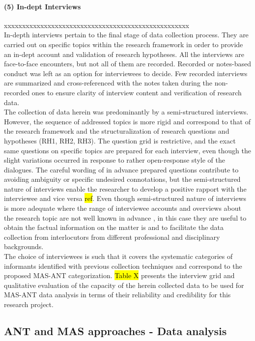 \documentclass[11pt]{report}
\begin{document}
\paragraph{(5) In-dept Interviews} xxxxxxxxxxxxxxxxxxxxxxxxxxxxxxxxxxxxxxxxxxxxxxxxxxx
\\
In-depth interviews pertain to the final stage of data collection process. They are carried out on specific topics within the research framework in order to provide an in-dept account and validation of research hypotheses. All the interviews are face-to-face encounters, but not all of them are recorded. Recorded or notes-based conduct was left as an option for interviewees to decide. Few recorded interviews are summarized and cross-referenced with the notes taken during the non-recorded ones to ensure clarity of interview content and verification of research data.
\\
The collection of data herein was predominantly by a semi-structured interviews. However, the sequence of addressed topics is more rigid and correspond to that of the research framework and the structuralization of research questions and hypotheses (RH1, RH2, RH3). The question grid is restrictive, and the exact same questions on specific topics are prepared for each interview, even though the slight variations occurred in response to rather open-response style of the dialogues. The careful wording of in advance prepared questions contribute to avoiding ambiguity or specific undesired connotations, but the semi-structured nature of interviews enable the researcher to develop a positive rapport with the interviewee and vice versa \hl{ref}. Even though semi-structured nature of interviews is more adequate where the range of interviewee accounts and overviews about the research topic are not well known in advance , in this case they are useful to obtain the factual  information on the matter is and to facilitate the data collection from interlocutors from different professional and disciplinary backgrounds. 
\\
The choice of interviewees is such that it covers the systematic categories of informants identified with previous collection techniques and correspond to the proposed MAS-ANT categorization. \hl{Table X} presents the interview grid and qualitative evaluation of the capacity of the herein collected data to be used for MAS-ANT data analysis in terms of their reliability and credibility for this research project.

\subsection{ANT and MAS approaches - Data analysis}
\end{document}
